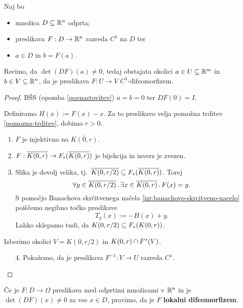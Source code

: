 \newpage
\begin{izrek}
    Naj bo 
    \begin{itemize}
        \item množica $D \subseteq \mathbb{R}^n$ odprta;
        \item preslikava $F: D \to \mathbb{R}^n$ razreda $C^1$ na \(D\) ter
        \item $a \in D$ in $b = F(a)$.
    \end{itemize}
    Recimo, da $\det(DF)(a) \neq 0$, tedaj obstajata okolici $a \in U \subseteq \mathbb{R}^m$ in $b \in V \subseteq \mathbb{R}^n$, da je preslikava $F: U \to V$ $C^1$-difeomorfizem. 
\end{izrek}

\begin{proof}
    BŠS (opomba \ref{poenastovitev}) \(a = b = 0\) ter \(DF(0) = I\).
    
    Definiramo \(H(x) := F(x) - x\). Za to preslikavo velja pomožna trditev \ref{pomozna-trditev}, dobimo \(r > 0\). 
    \begin{enumerate}
        \item \(F\) je injektivna na \(\overline{K(0, r)}\).
        \item \(F: \overline{K(0, r)} \to F_{*}(\overline{K(0, r)})\) je bijekcija in inverz je zvezen.
        \item Slika je dovolj velika, tj.\ \(\overline{K(0, r/2)} \subseteq F_{*}(\overline{K(0, r)})\). Torej 
        \[\forall y \in \overline{K(0, r / 2)}  \,.\, \exists x \in \overline{K(0, r)} \,.\,F(x) = y.\]
        S pomočjo Banachova skrčitvenega načela \ref{izr:banachovo-skrcitveno-nacelo} poiščemo negibno točko preslikave 
        \[T_y(x) := -H(x) + y.\]
        Lahko sklepamo tudi, da \(K(0, r/2) \subseteq F_{*}(K(0, r))\).
    \end{enumerate}
    Izberimo okolici \(V = K(0, r/2)\) in \(K(0, r) \cap F^{*}(V)\).
    \begin{enumerate}
        \item[4.] Pokažemo, da je preslikava \(F^{-1}: V \to U\) razreda \(C^1\). \qedhere 
    \end{enumerate}
\end{proof}

\begin{definicija}
    Če je $F: D \to \Omega$ preslikava med odprtimi množicami v $\mathbb{R}^n$ in je $\det(DF)(x) \neq 0$ za vse $x \in D$, pravimo, da je $F$ \textbf{lokalni difeomorfizem}.
\end{definicija}

